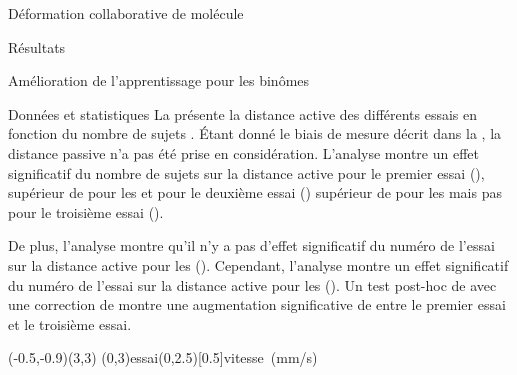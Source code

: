\documentclass[myfrancais,ngerman,english,french]{mythesis}
\begin{document}
\begin{mychapter}{Déformation collaborative de molécule}
\begin{mysection}{Résultats}
\begin{mysubsection}{Amélioration de l'apprentissage pour les binômes}
\begin{mysubsubsection}{Données et statistiques}
					La  présente la distance active  des différents essais  en fonction du nombre de sujets .
					Étant donné le biais de mesure décrit dans la , la distance passive n'a pas été prise en considération.
					L'analyse montre un effet significatif du nombre de sujets  sur la distance active  pour le premier essai (), supérieur de  pour les  et pour le deuxième essai () supérieur de  pour les  mais pas pour le troisième essai ().

					De plus, l'analyse montre qu'il n'y a pas d'effet significatif du numéro de l'essai  sur la distance active  pour les  ().
					Cependant, l'analyse montre un effet significatif du numéro de l'essai  sur la distance active  pour les  ().
					Un test post-hoc de  avec une correction de  montre une augmentation significative de  entre le premier essai et le troisième essai.

					\begin{myfigure}
						\begin{myps}(-0.5,-0.9)(3,3)
							\myaxes(0,3){essai}(0,2.5)[0.5]{vitesse~(mm/s)}
						\end{myps}
					\end{myfigure}


\end{mysubsubsection}
\end{mysubsection}
\end{mysection}
\end{mychapter}
\end{document}
